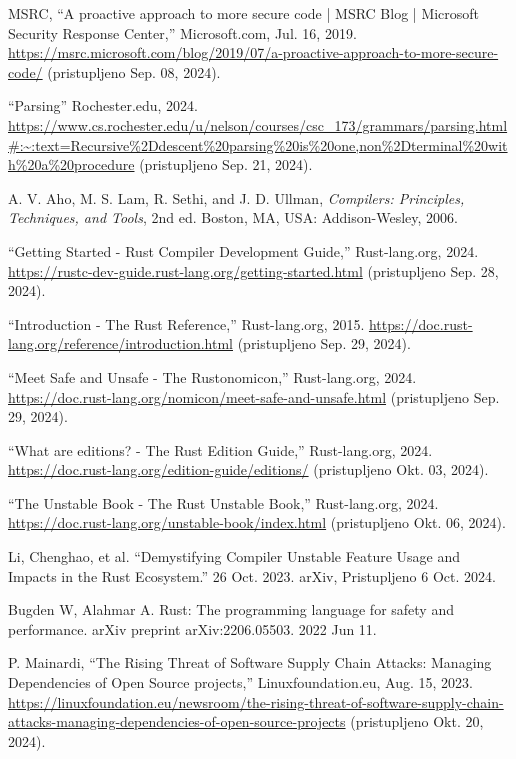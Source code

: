 \documentclass[11pt]{article}
\begin{document}
\begin{thebibliography}
    \raggedright
{} 
    MSRC, “A proactive approach to more secure code | MSRC Blog | 
    Microsoft Security Response Center,” Microsoft.com, Jul. 16, 2019. 
    \url{https://msrc.microsoft.com/blog/2019/07/a-proactive-approach-to-more-secure-code/} 
    (pristupljeno Sep. 08, 2024).

    “Parsing” Rochester.edu, 2024.
    \url{https://www.cs.rochester.edu/u/nelson/courses/csc_173/grammars/parsing.html#:~:text=Recursive%2Ddescent%20parsing%20is%20one,non%2Dterminal%20with%20a%20procedure} 
    (pristupljeno Sep. 21, 2024).

    A. V. Aho, M. S. Lam, R. Sethi, and J. D. Ullman, \emph{Compilers: Principles, Techniques, and Tools}, 2nd ed. Boston, MA, USA: Addison-Wesley, 2006.

    “Getting Started - Rust Compiler Development Guide,” Rust-lang.org, 2024. 
    \url{https://rustc-dev-guide.rust-lang.org/getting-started.html} (pristupljeno Sep. 28, 2024).

    “Introduction - The Rust Reference,” Rust-lang.org, 2015. 
    \url{https://doc.rust-lang.org/reference/introduction.html} (pristupljeno Sep. 29, 2024).
    
    “Meet Safe and Unsafe - The Rustonomicon,” Rust-lang.org, 2024. 
    \url{https://doc.rust-lang.org/nomicon/meet-safe-and-unsafe.html} (pristupljeno Sep. 29, 2024).

    “What are editions? - The Rust Edition Guide,” Rust-lang.org, 2024.
    \url{https://doc.rust-lang.org/edition-guide/editions/} (pristupljeno Okt. 03, 2024).

    “The Unstable Book - The Rust Unstable Book,” Rust-lang.org, 2024. 
    \url{https://doc.rust-lang.org/unstable-book/index.html} (pristupljeno Okt. 06, 2024).

    Li, Chenghao, et al. “Demystifying Compiler Unstable Feature Usage and Impacts in the Rust Ecosystem.” 26 Oct. 2023. arXiv, Pristupljeno 6 Oct. 2024. 

    Bugden W, Alahmar A. Rust: The programming language for safety and performance. arXiv preprint arXiv:2206.05503. 2022 Jun 11.

    P. Mainardi, “The Rising Threat of Software Supply Chain Attacks: Managing Dependencies of Open Source projects,” Linuxfoundation.eu, Aug. 15, 2023.
    \url{https://linuxfoundation.eu/newsroom/the-rising-threat-of-software-supply-chain-attacks-managing-dependencies-of-open-source-projects} (pristupljeno Okt. 20, 2024).


\end{thebibliography}
\end{document}
